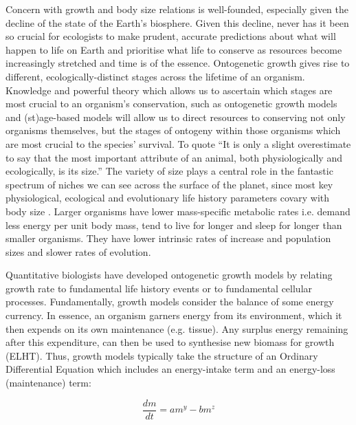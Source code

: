 \documentclass[a4paper]{article} %
\begin{document}
        Concern with growth and body size relations is well-founded, especially given the decline of the state of the Earth's biosphere. Given this decline, never has it been so crucial for ecologists to make prudent, accurate predictions about what will happen to life on Earth and prioritise what life to conserve as resources become increasingly stretched and time is of the essence. Ontogenetic growth gives rise to different, ecologically-distinct stages across the lifetime of an organism. Knowledge and powerful theory which allows us to ascertain which stages are most crucial to an organism's conservation, such as ontogenetic growth models and (st)age-based models will allow us to direct resources to conserving not only organisms themselves, but the stages of ontogeny within those organisms which are most crucial to the species' survival. To quote \cite{Bartholomew1981} ``It is only a slight overestimate to say that the most important attribute of an animal, both physiologically and ecologically, is its size.'' The variety of size plays a central role in the fantastic spectrum of niches we can see across the surface of the planet, since most key physiological, ecological and evolutionary life history parameters covary with body size \autocite{peters1983, brown2000-scaling-book,schmidt1984scaling,Marshall2019b}. Larger organisms have lower mass-specific metabolic rates i.e. demand less energy per unit body mass, tend to live for longer and sleep for longer than smaller organisms. They have lower intrinsic rates of increase and population sizes and slower rates of evolution. 

        Quantitative biologists have developed ontogenetic growth models by relating growth rate to fundamental life history events or to fundamental cellular processes. Fundamentally, growth models consider the balance of some energy currency. In essence, an organism garners energy from its environment, which it then expends on its own maintenance (e.g. tissue). Any surplus energy remaining after this expenditure, can then be used to synthesise new biomass for growth (ELHT). Thus, growth models typically take the structure of an Ordinary Differential Equation which includes an energy-intake term and an energy-loss (maintenance) term:

        \begin{equation}
            \frac{dm}{dt} = am^y - bm^z \label{difference_equation}
        \end{equation}
        
\end{document}
